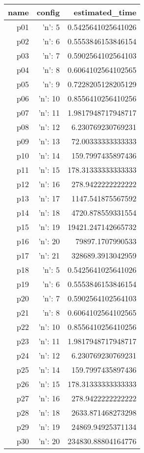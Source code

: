 \documentclass{article}
\begin{document}
                            \begin{center}
                            \scriptsize
                            \begin{tabular}{r|r|r}
                            name & config & estimated\_time\\\midrule
                              p01&{'n': 5}&0.5425641025641026\\
  p02&{'n': 6}&0.5553846153846154\\
  p03&{'n': 7}&0.5902564102564103\\
  p04&{'n': 8}&0.6064102564102565\\
  p05&{'n': 9}&0.7228205128205129\\
  p06&{'n': 10}&0.8556410256410256\\
  p07&{'n': 11}&1.9817948717948717\\
  p08&{'n': 12}&6.230769230769231\\
  p09&{'n': 13}&72.00333333333333\\
  p10&{'n': 14}&159.7997435897436\\
  p11&{'n': 15}&178.31333333333333\\
  p12&{'n': 16}&278.9422222222222\\
  p13&{'n': 17}&1147.541875567592\\
  p14&{'n': 18}&4720.878559331554\\
  p15&{'n': 19}&19421.247142665732\\
  p16&{'n': 20}&79897.1707990533\\
  p17&{'n': 21}&328689.3913042959\\
  p18&{'n': 5}&0.5425641025641026\\
  p19&{'n': 6}&0.5553846153846154\\
  p20&{'n': 7}&0.5902564102564103\\
  p21&{'n': 8}&0.6064102564102565\\
  p22&{'n': 10}&0.8556410256410256\\
  p23&{'n': 11}&1.9817948717948717\\
  p24&{'n': 12}&6.230769230769231\\
  p25&{'n': 14}&159.7997435897436\\
  p26&{'n': 15}&178.31333333333333\\
  p27&{'n': 16}&278.9422222222222\\
  p28&{'n': 18}&2633.871468273298\\
  p29&{'n': 19}&24869.94925371134\\
  p30&{'n': 20}&234830.88804164776
                            \end{tabular}
                            \end{center}
                    
\end{document}
